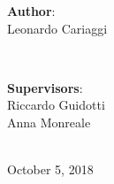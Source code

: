 \documentclass[
    pdftex,
    fontsize=11pt,
    a4paper
   ]{scrbook}
\begin{document}
\begin{titlepage}

\begin{minipage}{0.4\textwidth}
\begin{flushleft} \Large

\textbf{Author}:\\
Leonardo Cariaggi %
\end{flushleft}
\end{minipage}
~
\begin{minipage}{0.4\textwidth}
\begin{flushright} \Large
\textbf{Supervisors}: \\
Riccardo Guidotti\\ %
Anna Monreale %
\end{flushright}
\end{minipage}\\[2cm]


{\Large October 5, 2018}\\[2cm] %

\vfill %
\end{titlepage}
\end{document}
